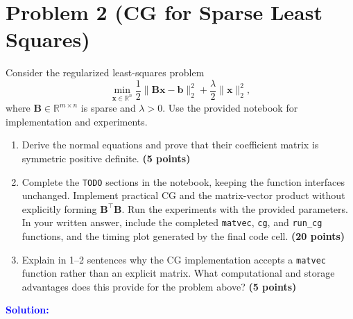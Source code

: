 \documentclass[11pt,a4paper]{article}
\newcommand{\solution}{\par\medskip
    \textcolor{blue}{\textbf{Solution:}}\par\smallskip}
\begin{document}
\newpage



\section*{Problem 2 (CG for Sparse Least Squares)}

Consider the regularized least-squares problem
\[
    \min_{\mathbf{x}\in\mathbb{R}^n}
    \frac12\|\mathbf{B}\mathbf{x}-\mathbf{b}\|_2^2
    +\frac{\lambda}{2}\|\mathbf{x}\|_2^2,
\]
where $\mathbf{B}\in\mathbb{R}^{m\times n}$ is sparse and
$\lambda>0$. Use the provided notebook for implementation
and experiments.

\begin{enumerate}
    \item Derive the normal equations and prove that their
    coefficient matrix is symmetric positive definite.
    \textbf{(5 points)}

    \item Complete the \texttt{TODO} sections in the notebook,
    keeping the function interfaces unchanged.
    Implement practical CG and the matrix-vector product
    without explicitly forming $\mathbf{B}^\top\mathbf{B}$.
    Run the experiments with the provided parameters.
    In your written answer, include the completed
    \texttt{matvec}, \texttt{cg}, and \texttt{run\_cg} functions,
    and the timing plot generated by the final code cell.
    \textbf{(20 points)}

    \item Explain in 1--2 sentences why the CG implementation
    accepts a \texttt{matvec} function rather than an explicit
    matrix. What computational and storage advantages does
    this provide for the problem above?
    \textbf{(5 points)}
\end{enumerate}

\solution
\end{document}
